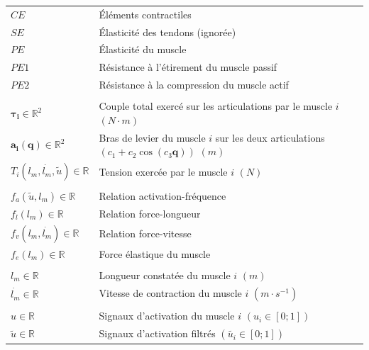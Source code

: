 \documentclass[pdftex,a4paper,11pt]{report}
\newcommand{\vs}[1]{\boldsymbol{#1}} %
\numberwithin{equation}{subsection}
\begin{document}
\begin{tabular}{ll}
    $CE$  & Éléments contractiles \\
    $SE$  & Élasticité des tendons (ignorée) \\
    $PE$  & Élasticité du muscle \\
    $PE1$ & Résistance à l'étirement du muscle passif \\
    $PE2$ & Résistance à la compression du muscle actif \\
    \\

    $\vs{\tau_i} \in \mathbb{R}^2$                   & Couple total exercé sur les articulations par le muscle $i$ $(N \cdot m)$ \\
    $\vs{a_i}(\vs{q}) \in \mathbb{R}^2$              & Bras de levier du muscle $i$ sur les deux articulations $(c_1 + c_2 \cos (c_3 \vs{q}))$ $(m)$ \\
    $T_i(l_m, \dot{l_m}, \tilde{u}) \in \mathbb{R}$  & Tension exercée par le muscle $i$ $(N)$ \\
    \\

    $f_a(\tilde{u}, l_m) \in \mathbb{R}$   & Relation activation-fréquence \\
    $f_l(l_m) \in \mathbb{R}$              & Relation force-longueur \\
    $f_v(l_m, \dot{l_m}) \in \mathbb{R}$   & Relation force-vitesse \\
    $f_e(l_m) \in \mathbb{R}$              & Force élastique du muscle \\ %
    \\

    $l_m \in \mathbb{R}$                   & Longueur constatée du muscle $i$ $(m)$ \\
    $\dot{l_m} \in \mathbb{R}$             & Vitesse de contraction du muscle $i$ $(m \cdot s^{-1})$ \\
    \\

    $u \in \mathbb{R}$                     & Signaux d'activation du muscle $i$ $(u_i \in [0;1])$ \\
    $\tilde{u} \in \mathbb{R}$             & Signaux d'activation filtrés $(\tilde{u_i} \in [0;1])$ \\
\end{tabular}
\end{document}
